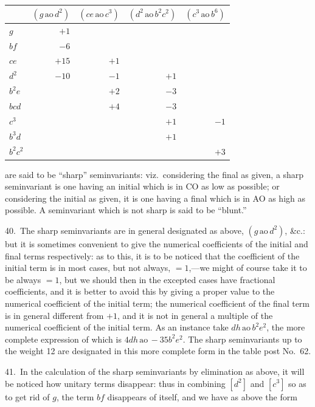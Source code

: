 \documentclass[11pt]{article}
\begin{document}
\begin{center}
\begin{tabular}{l|rrrr}
 & $(g\,\mathrm{ao}\,d^2)$ & $(ce\,\mathrm{ao}\,c^3)$ & $(d^2\,\mathrm{ao}\,b^2 c^2)$ & $(c^3\,\mathrm{ao}\,b^6)$ \\
\hline
$g$ & $+1$ & & & \\
$bf$ & $-6$ & & & \\
$ce$ & $+15$ & $+1$ & & \\
$d^2$ & $-10$ & $-1$ & $+1$ & \\
$b^2 e$ & & $+2$ & $-3$ & \\
$bcd$ & & $+4$ & $-3$ & \\
$c^3$ & & & $+1$ & $-1$ \\
$b^3 d$ & & & $+1$ & \\
$b^2 c^2$ & & & & $+3$ \\
\end{tabular}
\end{center}

are said to be ``sharp'' seminvariants: viz.\ considering the final as given, a sharp seminvariant is one having an initial which is in CO as low as possible; or considering the initial as given, it is one having a final which is in AO as high as possible. A seminvariant which is not sharp is said to be ``blunt.''

40.\ The sharp seminvariants are in general designated as above, $(g\,\mathrm{ao}\,d^2)$, \&c.: but it is sometimes convenient to give the numerical coefficients of the initial and final terms respectively: as to this, it is to be noticed that the coefficient of the initial term is in most cases, but not always, $= 1$,---we might of course take it to be always $= 1$, but we should then in the excepted cases have fractional coefficients, and it is better to avoid this by giving a proper value to the numerical coefficient of the initial term; the numerical coefficient of the final term is in general different from $+1$, and it is not in general a multiple of the numerical coefficient of the initial term. As an instance take $dh\,\mathrm{ao}\,b^2 e^2$, the more complete expression of which is $4dh\,\mathrm{ao}\,-35 b^2 e^2$. The sharp seminvariants up to the weight 12 are designated in this more complete form in the table post No.\ 62.

41.\ In the calculation of the sharp seminvariants by elimination as above, it will be noticed how unitary terms disappear: thus in combining $[d^2]$ and $[c^3]$ so as to get rid of $g$, the term $bf$ disappears of itself, and we have as above the form
\end{document}
